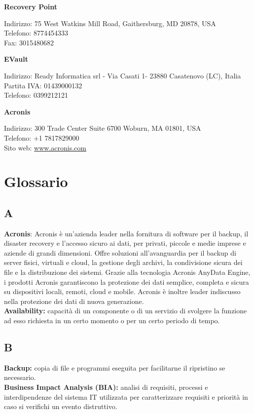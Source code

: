 \documentclass[12pt, a4paper, titlepage]{report}
\newcommand\tab[1][1cm]{\hspace*{#1}}
\begin{document}
	\textbf{Recovery Point}
	\begin{adjustwidth}{0.5cm}{}
		\tab Indirizzo: 75 West Watkins Mill Road, Gaithersburg, MD 20878, USA \\
		\tab Telefono: 8774454333  \\
		\tab Fax: 3015480682
	\end{adjustwidth}
	
	\textbf{EVault}
	\begin{adjustwidth}{0.5cm}{}
		\tab Indirizzo: Ready Informatica srl - Via Casati 1- 23880 Casatenovo (LC), Italia \\
		\tab Partita IVA: 01439000132 \\
		\tab Telefono: 0399212121 
	\end{adjustwidth}
	
	\textbf{Acronis}
	\begin{adjustwidth}{0.5cm}{}
		\tab Indirizzo: 300 Trade Center Suite 6700 Woburn, MA 01801, USA \\
		\tab Telefono: +1 7817829000 \\
		\tab Sito web: \url{www.acronis.com} 
	\end{adjustwidth}
	

	\chapter{Glossario} \label{glossario}
	\section*{A}
	\textbf{Acronis}: Acronis è un'azienda leader nella fornitura di software per il backup, il disaster recovery e l’accesso sicuro ai dati, per privati, piccole e medie imprese e aziende di grandi dimensioni. Offre soluzioni all’avanguardia per il backup di server fisici, virtuali e cloud, la gestione degli archivi, la condivisione sicura dei file e la distribuzione dei sistemi. Grazie alla tecnologia Acronis AnyData Engine, i prodotti Acronis garantiscono la protezione dei dati semplice, completa e sicura su dispositivi locali, remoti, cloud e mobile. Acronis è inoltre leader indiscusso nella protezione dei dati di nuova generazione.\\
	\textbf{Availability:} capacità di un componente o di un servizio di svolgere la funzione ad esso richiesta in un certo momento o per un certo periodo di tempo.
	
	\section*{B}
	\textbf{Backup:} copia di file e programmi eseguita per facilitarne il ripristino se necessario.\\
	\textbf{Business Impact Analysis (BIA):} analisi di requisiti, processi e interdipendenze del sistema IT utilizzata per caratterizzare requisiti e priorità in caso si verifichi un evento distruttivo.
	
\end{document}
